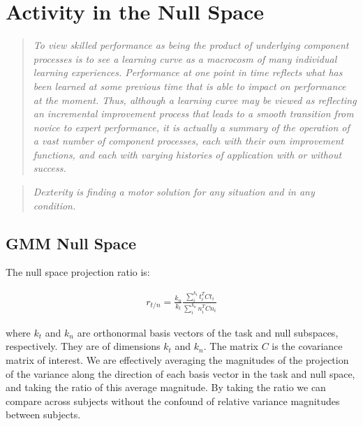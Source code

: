 \documentclass[../main.tex]{subfiles}
\begin{document}
\chapter{Activity in the Null Space}\label{chap:nullspace}

\begin{quote}
  \emph{To view skilled performance as being the product of underlying component processes is to see a learning curve as a macrocosm of many individual learning experiences. Performance at one point in time reflects what has been learned at some previous time that is able to impact on performance at the moment. Thus, although a learning curve may be viewed as reflecting an incremental improvement process that leads to a smooth transition from novice to expert performance, it is actually a summary of the operation of a vast number of component processes, each with their own improvement functions, and each with varying histories of application with or without success.}\\
\end{quote}

\begin{quote}
  \emph{Dexterity is finding a motor solution for any situation and in any condition.}\\
\end{quote}


\cleardoublepage%

\section{GMM Null Space}


The null space projection ratio is:

\begin{align}
  r_{t/n} = \frac{k_n}{k_t}\frac{\sum_i^{k_t}{t_i^TCt_i}}{\sum_i^{k_n}{n_i^TCn_i}}
\end{align}

where $k_t$ and $k_n$ are orthonormal basis vectors of the task and null subspaces, respectively. They are of dimensions $k_t$ and $k_n$. The matrix $C$ is the covariance matrix of interest. We are effectively averaging the magnitudes of the projection of the variance along the direction of each basis vector in the task and null space, and taking the ratio of this average magnitude. By taking the ratio we can compare across subjects without the confound of relative variance magnitudes between subjects.
\end{document}
